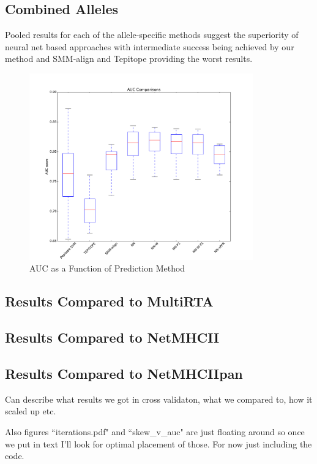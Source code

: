 \documentclass[journal]{IEEEtran}
\begin{document}
\subsection{Combined Alleles}
Pooled results for each of the allele-specific methods suggest the superiority of neural net based approaches with intermediate success being achieved by our method and SMM-align and Tepitope providing the worst results.
\begin{figure}[!h]
\centering
\includegraphics[width=3.8in]{combined}
\caption{AUC as a Function of Prediction Method}
\label{fig_sim}
\end{figure}


\subsection{Results Compared to MultiRTA}
\subsection{Results Compared to NetMHCII}
\subsection{Results Compared to NetMHCIIpan}
Can describe what results we got in cross validaton, what we compared to, how it scaled up etc.

Also figures ``iterations.pdf" and ``skew\_v\_auc" are just floating around so once we put in text I'll look for optimal placement of those. For now just including the code. 
\end{document}
